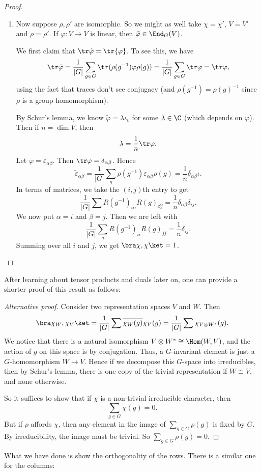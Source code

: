 \documentclass[a4paper]{article}
\begin{document}
\begin{proof}
\begin{enumerate}
    \item Now suppose $\rho, \rho'$ are isomorphic. So we might as well take $\chi = \chi'$, $V = V'$ and $\rho = \rho'$. If $\varphi: V \to V$ is linear, then $\tilde{\varphi} \in \End_G(V)$.

      We first claim that $\tr \tilde{\varphi} = \tr{\varphi}$. To see this, we have
      \[
        \tr \tilde{\varphi} = \frac{1}{|G|} \sum_{g \in G} \tr(\rho(g^{-1}) \varphi \rho(g)) = \frac{1}{|G|} \sum_{g \in G} \tr \varphi = \tr \varphi,
      \]
      using the fact that traces don't see conjugacy (and $\rho(g^{-1}) = \rho(g)^{-1}$ since $\rho$ is a group homomorphism).

      By Schur's lemma, we know $\tilde{\varphi} = \lambda \iota_v$ for some $\lambda \in \C$ (which depends on $\varphi$). Then if $n = \dim V$, then
      \[
        \lambda = \frac{1}{n} \tr \varphi.
      \]
      Let $\varphi = \varepsilon_{\alpha\beta}$. Then $\tr \varphi = \delta_{\alpha\beta}$. Hence
      \[
        \tilde{\varepsilon}_{\alpha\beta} = \frac{1}{|G|} \sum_g \rho(g^{-1}) \varepsilon_{\alpha\beta}\rho(g) = \frac{1}{n} \delta_{\alpha\beta} \iota.
      \]
      In terms of matrices, we take the $(i, j)$th entry to get
      \[
        \frac{1}{|G|} \sum R(g^{-1})_{i\alpha} R(g)_{\beta j} = \frac{1}{n} \delta_{\alpha\beta} \delta_{ij}.
      \]
      We now put $\alpha = i$ and $\beta = j$. Then we are left with
      \[
        \frac{1}{|G|} \sum_g R(g^{-1})_{ii} R(g)_{jj} = \frac{1}{n} \delta_{ij}.
      \]
      Summing over all $i$ and $j$, we get $\bra \chi, \chi \ket = 1$.
  \end{enumerate}
\end{proof}

After learning about tensor products and duals later on, one can provide a shorter proof of this result as follows:
\begin{proof}[Alternative proof]
  Consider two representation spaces $V$ and $W$. Then
  \[
    \bra \chi_{W}, \chi_V\ket = \frac{1}{|G|} \sum \overline{\chi_W(g)} \chi_V(g) = \frac{1}{|G|} \sum \chi_{V \otimes W^*}(g).
  \]
  We notice that there is a natural isomorphism $V \otimes W^* \cong \Hom(W, V)$, and the action of $g$ on this space is by conjugation. Thus, a $G$-invariant element is just a $G$-homomorphism $W \to V$. Hence if we decompose this $G$-space into irreducibles, then by Schur's lemma, there is one copy of the trivial representation if $W \cong V$, and none otherwise.

  So it suffices to show that if $\chi$ is a non-trivial irreducible character, then
  \[
    \sum_{g \in G} \chi(g) = 0.
  \]
  But if $\rho$ affords $\chi$, then any element in the image of $\sum_{g \in G} \rho(g)$ is fixed by $G$. By irreducibility, the image must be trivial. So $\sum_{g \in G} \rho(g) = 0$.
\end{proof}
What we have done is show the orthogonality of the rows. There is a similar one for the columns:
\end{document}
